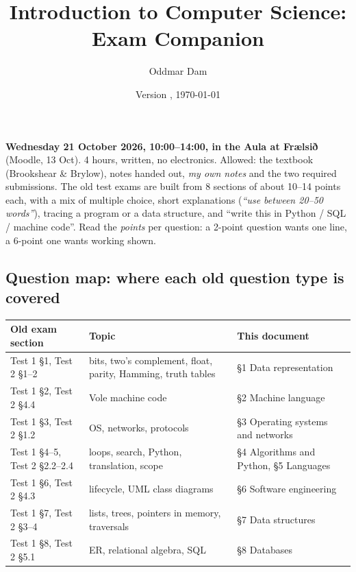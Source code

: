 \documentclass{fkt-notes}
\author{Oddmar Dam}
\title{Introduction to Computer Science: Exam Companion}
\date{Version \docversion, \today}
\begin{document}
\maketitle

\begin{keybox}[title={The exam in one paragraph}]
  \textbf{Wednesday 21 October 2026, 10:00--14:00, in the Aula at Frælsið} (Moodle, 13 Oct).
  4 hours, written, no electronics. Allowed: the textbook (Brookshear \& Brylow),
  notes handed out, \emph{my own notes} and the two required submissions. The old
  test exams are built from 8 sections of about 10--14 points each, with a
  mix of multiple choice, short explanations (\emph{``use between 20--50
    words''}), tracing a program or a data structure, and ``write this in
  Python / SQL / machine code''. Read the \emph{points} per question: a
  2-point question wants one line, a 6-point one wants working shown.
\end{keybox}

\subsection*{Question map: where each old question type is covered}
\begin{center}
  \small\renewcommand{\arraystretch}{1.2}
  \begin{tabular}{@{}p{4.6cm}p{3.6cm}p{6.4cm}@{}}
    \toprule
    Old exam section                 & Topic                                                        & This document                            \\
    \midrule
    Test 1 \S1, Test 2 \S1--2        & bits, two's complement, float, parity, Hamming, truth tables & \S1 Data representation                  \\
    Test 1 \S2, Test 2 \S4.4         & Vole machine code                                            & \S2 Machine language                     \\
    Test 1 \S3, Test 2 \S1.2         & OS, networks, protocols                                      & \S3 Operating systems and networks       \\
    Test 1 \S4--5, Test 2 \S2.2--2.4 & loops, search, Python, translation, scope                    & \S4 Algorithms and Python, \S5 Languages \\
    Test 1 \S6, Test 2 \S4.3         & lifecycle, UML class diagrams                                & \S6 Software engineering                 \\
    Test 1 \S7, Test 2 \S3--4        & lists, trees, pointers in memory, traversals                 & \S7 Data structures                      \\
    Test 1 \S8, Test 2 \S5.1         & ER, relational algebra, SQL                                  & \S8 Databases                            \\
    \bottomrule
  \end{tabular}
\end{center}
\end{document}
